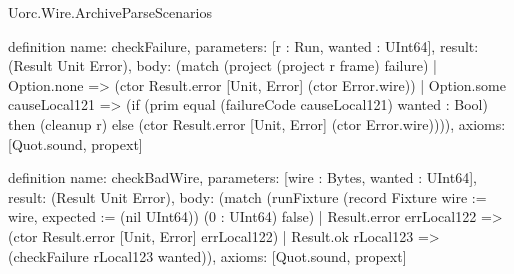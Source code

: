 \begin{lexlean}{Uorc.Wire.ArchiveParseScenarios}
\begin{semanticmodule}
definition{
  name: checkFailure,
  parameters: [r : Run, wanted : UInt64],
  result: (Result Unit Error),
  body: (match (project (project r frame) failure)
    | Option.none => (ctor Result.error [Unit, Error] (ctor Error.wire))
    | Option.some causeLocal121 => (if (prim equal (failureCode causeLocal121) wanted : Bool) then (cleanup r) else (ctor Result.error [Unit, Error] (ctor Error.wire)))),
  axioms: [Quot.sound, propext]
}

definition{
  name: checkBadWire,
  parameters: [wire : Bytes, wanted : UInt64],
  result: (Result Unit Error),
  body: (match (runFixture (record Fixture {wire := wire, expected := (nil UInt64)}) (0 : UInt64) false)
    | Result.error errLocal122 => (ctor Result.error [Unit, Error] errLocal122)
    | Result.ok rLocal123 => (checkFailure rLocal123 wanted)),
  axioms: [Quot.sound, propext]
}


\end{semanticmodule}
\end{lexlean}

